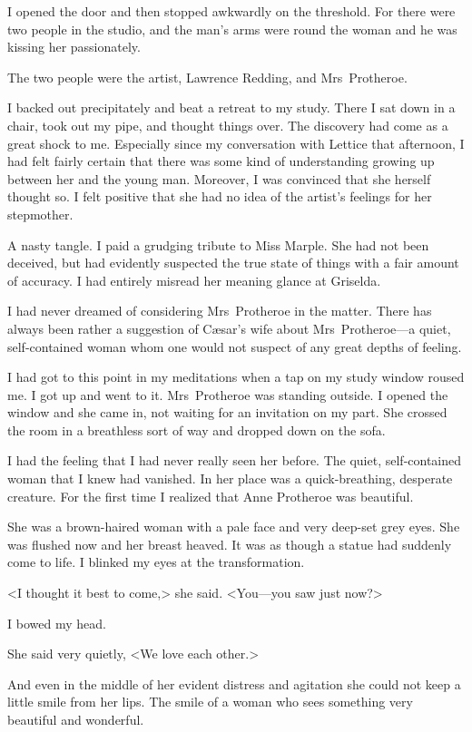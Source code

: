 I opened the door and then stopped awkwardly on the threshold. For there were two people in the studio, and the man's arms were round the woman and he was kissing her passionately.

The two people were the artist, Lawrence Redding, and Mrs~Protheroe.

I backed out precipitately and beat a retreat to my study. There I sat down in a chair, took out my pipe, and thought things over. The discovery had come as a great shock to me. Especially since my conversation with Lettice that afternoon, I had felt fairly certain that there was some kind of understanding growing up between her and the young man. Moreover, I was convinced that she herself thought so. I felt positive that she had no idea of the artist's feelings for her stepmother.

A nasty tangle. I paid a grudging tribute to Miss Marple. She had not been deceived, but had evidently suspected the true state of things with a fair amount of accuracy. I had entirely misread her meaning glance at Griselda.

I had never dreamed of considering Mrs~Protheroe in the matter. There has always been rather a suggestion of Cæsar's wife about Mrs~Protheroe—a quiet, self-contained woman whom one would not suspect of any great depths of feeling.

I had got to this point in my meditations when a tap on my study window roused me. I got up and went to it. Mrs~Protheroe was standing outside. I opened the window and she came in, not waiting for an invitation on my part. She crossed the room in a breathless sort of way and dropped down on the sofa.

I had the feeling that I had never really seen her before. The quiet, self-contained woman that I knew had vanished. In her place was a quick-breathing, desperate creature. For the first time I realized that Anne Protheroe was beautiful.

She was a brown-haired woman with a pale face and very deep-set grey eyes. She was flushed now and her breast heaved. It was as though a statue had suddenly come to life. I blinked my eyes at the transformation.

<I thought it best to come,> she said. <You—you saw just now?>

I bowed my head.

She said very quietly, <We love each other.>

And even in the middle of her evident distress and agitation she could not keep a little smile from her lips. The smile of a woman who sees something very beautiful and wonderful.

